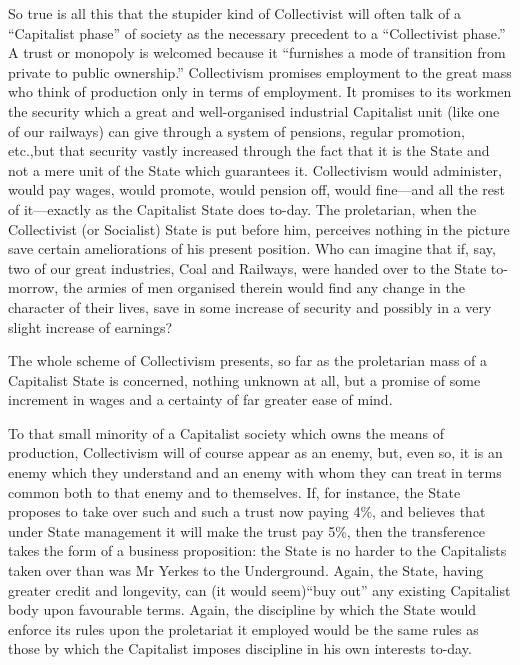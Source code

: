 \documentclass{book}
\begin{document}
So true is all this that the stupider kind of Collectivist will often talk of a “Capitalist phase” of society as the necessary precedent to a “Collectivist phase.” A trust or monopoly is welcomed because it “furnishes a mode of transition from private to public ownership.” Collectivism promises employment to the great mass who think of production only in terms of employment. It promises to its workmen the security which a great and well-organised industrial Capitalist unit (like one of our railways) can give through a system of pensions, regular promotion, etc.,but that security vastly increased through the fact that it is the State and not a mere unit of the State which guarantees it. Collectivism would administer, would pay wages, would promote, would pension off, would fine—and all the rest of it—exactly as the Capitalist State does to-day. The proletarian, when the Collectivist (or Socialist) State is put before him, perceives nothing in the picture save certain ameliorations of his present position. Who can imagine that if, say, two of our great industries, Coal and Railways, were handed over to the State to-morrow, the armies of men organised therein would find any change in the character of their lives, save in some increase of security and possibly in a very slight increase of earnings?

The whole scheme of Collectivism presents, so far as the proletarian mass of a Capitalist State is concerned, nothing unknown at all, but a promise of some increment in wages and a certainty of far greater ease of mind.

To that small minority of a Capitalist society which owns the means of production, Collectivism will of course appear as an enemy, but, even so, it is an enemy which they understand and an enemy with whom they can treat in terms common both to that enemy and to themselves. If, for instance, the State proposes to take over such and such a trust now paying 4\%, and believes that under State management it will make the trust pay 5\%, then the transference takes the form of a business proposition: the State is no harder to the Capitalists taken over than was Mr Yerkes to the Underground. Again, the State, having greater credit and longevity, can (it would seem)\footnotemark[1] “buy out” any existing Capitalist body upon favourable terms. Again, the discipline by which the State would enforce its rules upon the proletariat it employed would be the same rules as those by which the Capitalist imposes discipline in his own interests to-day.
\end{document}
